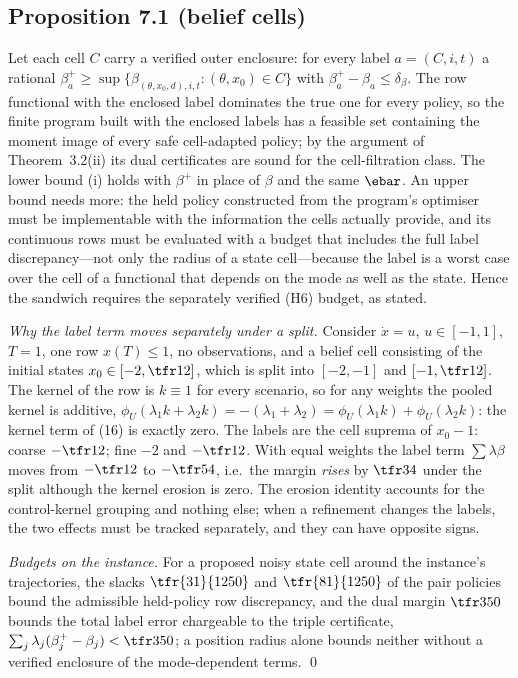 \subsection{Proposition 7.1 (belief cells)}
Let each cell $C$ carry a verified outer enclosure: for every label $a=(C,i,t)$ a rational $\beta_a^+\ge\sup\{\beta_{(\theta,x_0,d),i,t}:(\theta,x_0)\in C\}$ with $\beta^+_a-\beta_a\le\delta_\beta$. The row functional with the enclosed label dominates the true one for every policy, so the finite program built with the enclosed labels has a feasible set containing the moment image of every safe cell-adapted policy; by the argument of Theorem~3.2(ii) its dual certificates are sound for the cell-filtration class. The lower bound (i) holds with $\beta^+$ in place of $\beta$ and the same $\ebar$. An upper bound needs more: the held policy constructed from the program's optimiser must be implementable with the information the cells actually provide, and its continuous rows must be evaluated with a budget that includes the full label discrepancy---not only the radius of a state cell---because the label is a worst case over the cell of a functional that depends on the mode as well as the state. Hence the sandwich requires the separately verified (H6) budget, as stated.

\emph{Why the label term moves separately under a split.} Consider $\dot x=u$, $u\in[-1,1]$, $T=1$, one row $x(T)\le1$, no observations, and a belief cell consisting of the initial states $x_0\in[-2,\tfr12]$, which is split into $[-2,-1]$ and $[-1,\tfr12]$. The kernel of the row is $k\equiv1$ for every scenario, so for any weights the pooled kernel is additive, $\phi_U(\lambda_1k+\lambda_2k)=-(\lambda_1+\lambda_2)=\phi_U(\lambda_1k)+\phi_U(\lambda_2k)$: the kernel term of (16) is exactly zero. The labels are the cell suprema of $x_0-1$: coarse $-\tfr12$; fine $-2$ and $-\tfr12$. With equal weights the label term $\sum\lambda\beta$ moves from $-\tfr12$ to $-\tfr54$, i.e.\ the margin \emph{rises} by $\tfr34$ under the split although the kernel erosion is zero. The erosion identity accounts for the control-kernel grouping and nothing else; when a refinement changes the labels, the two effects must be tracked separately, and they can have opposite signs.

\emph{Budgets on the instance.} For a proposed noisy state cell around the instance's trajectories, the slacks $\tfr{31}{1250}$ and $\tfr{81}{1250}$ of the pair policies bound the admissible held-policy row discrepancy, and the dual margin $\tfr3{50}$ bounds the total label error chargeable to the triple certificate, $\sum_j\lambda_j(\beta^+_j-\beta_j)<\tfr3{50}$; a position radius alone bounds neither without a verified enclosure of the mode-dependent terms. \qed
